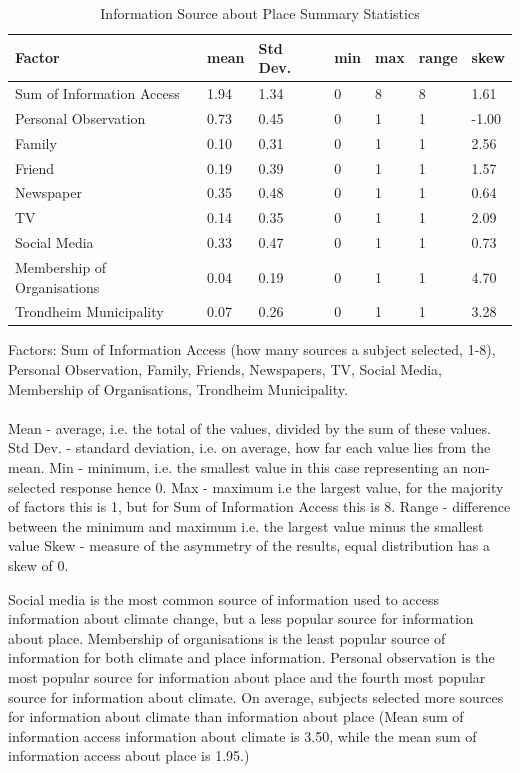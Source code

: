 \begin{center}
\begin{table}[H]
    \centering
    \begin{tabular}{|l|l|l|l|l|l|l|}
    \hline
         \textbf{Factor} & \textbf{mean} & \textbf{Std Dev.} & \textbf{min} & \textbf{max} & \textbf{range} & \textbf{skew}  \\ \hline
        Sum of Information Access & 1.94 & 1.34 & 0 & 8 & 8 & 1.61 \\ \hline
        Personal Observation & 0.73 & 0.45 & 0 & 1 & 1 & -1.00  \\ \hline
        Family & 0.10 & 0.31 & 0 & 1 & 1 & 2.56 \\ \hline
        Friend & 0.19 & 0.39 & 0 & 1 & 1 & 1.57  \\ \hline
        Newspaper & 0.35 & 0.48 & 0 & 1 & 1 & 0.64  \\ \hline
        TV & 0.14 & 0.35 & 0 & 1 & 1 & 2.09 \\ \hline
       Social Media & 0.33 & 0.47 & 0 & 1 & 1 & 0.73  \\ \hline
        Membership of Organisations & 0.04 & 0.19 & 0 & 1 & 1 & 4.70 \\ \hline
        Trondheim Municipality & 0.07 & 0.26 & 0 & 1 & 1 & 3.28\\ \hline
                
         \end{tabular}
    \caption{Information Source about Place Summary Statistics}{Factors: Sum of Information Access (how many sources a subject selected, 1-8), Personal Observation, Family, Friends, Newspapers, TV, Social Media, Membership of Organisations, Trondheim Municipality. 
    \paragraph{}
    Mean - average, i.e. the total of the values, divided by the sum of these values. 
    Std Dev. - standard deviation, i.e. on average, how far each value lies from the mean.
    Min - minimum, i.e. the smallest value in this case representing an non-selected response hence 0.
    Max - maximum i.e the largest value, for the majority of factors this is 1, but for Sum of Information Access this is 8.
    Range - difference between the minimum and maximum i.e. the largest value minus the smallest value
    Skew - measure of the asymmetry of the results, equal distribution has a skew of 0.}
\label{table:sum_stats_info__place_access}
\end{table}
\end{center}
Social media is the most common source of information used to access information about climate change, but a less popular source for information about place. Membership of organisations is the least popular source of information for both climate and place information. Personal observation is the most popular source for information about place and the fourth most popular source for information about climate. On average, subjects selected more sources for information about climate than information about place (Mean sum of information access information about climate is 3.50, while the mean sum of information access about place is 1.95.) 

